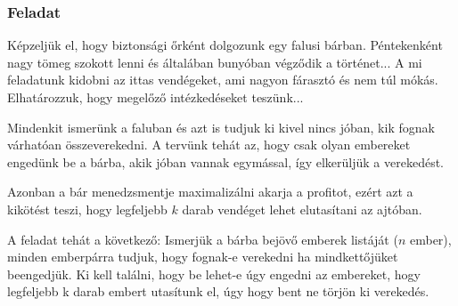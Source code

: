 \begin{frame}
\frametitle{Feladat}
Képzeljük el, hogy biztonsági őrként dolgozunk egy falusi bárban. Péntekenként nagy tömeg szokott lenni és
általában bunyóban végződik a történet... A mi feladatunk kidobni az ittas vendégeket, ami nagyon fárasztó
és nem túl mókás. Elhatározzuk, hogy megelőző intézkedéseket teszünk...

Mindenkit ismerünk a faluban és azt is tudjuk ki kivel nincs jóban, kik fognak várhatóan összeverekedni.
A tervünk tehát az, hogy csak olyan embereket engedünk be a bárba, akik jóban vannak egymással, így
elkerüljük a verekedést.

Azonban a bár menedzsmentje maximalizálni akarja a profitot, ezért azt a kikötést teszi, hogy legfeljebb
$k$ darab vendéget lehet elutasítani az ajtóban.

A feladat tehát a következő: Ismerjük a bárba bejövő emberek listáját ($n$ ember), minden emberpárra
tudjuk, hogy fognak-e verekedni ha mindkettőjüket beengedjük. Ki kell találni, hogy be lehet-e úgy
engedni az embereket, hogy legfeljebb k darab embert utasítunk el, úgy hogy bent ne törjön ki verekedés.
\end{frame}
